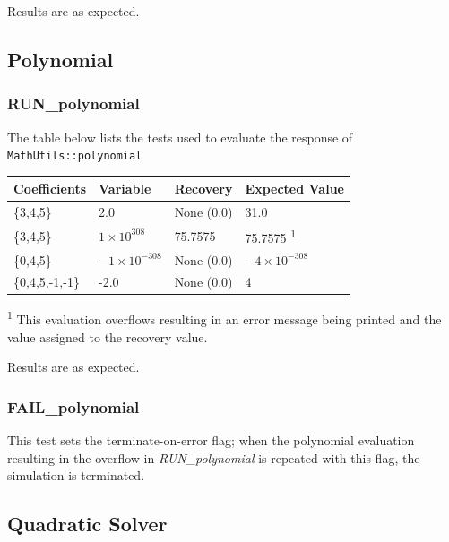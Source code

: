 \documentclass[11pt,fleqn]{report}
\begin{document}
Results are as expected.


\subsection{Polynomial}
\subsubsection{RUN\_polynomial}
The table below lists the tests used to evaluate the response of
\texttt{MathUtils::polynomial}
\begin{center}
\begin{tabular}{|l||l|l|l|}
\hline
 \textbf{Coefficients} & \textbf{Variable} &
 \textbf{Recovery} & \textbf {Expected Value} \\
\hline \hline
\{3,4,5\} & 2.0& None (0.0) & 31.0 \\
\{3,4,5\} & $1 \times 10^{308}$& 75.7575& 75.7575
\textsuperscript{1} \\
\{0,4,5\} &$-1 \times 10^{-308}$ & None (0.0) &
$-4 \times 10^{-308}$ \\
\{0,4,5,-1,-1\} & -2.0 & None (0.0) & 4\\
\hline \hline
\end{tabular}
\end{center}
\textsuperscript{1} This evaluation overflows resulting in an error message being printed and the value assigned to the recovery value.

Results are as expected.

\subsubsection{FAIL\_polynomial}
This test sets the terminate-on-error flag; when the polynomial evaluation resulting in the overflow in \textit{RUN\_polynomial} is 
repeated with this flag, the simulation is terminated.

\subsection{Quadratic Solver}
\end{document}

